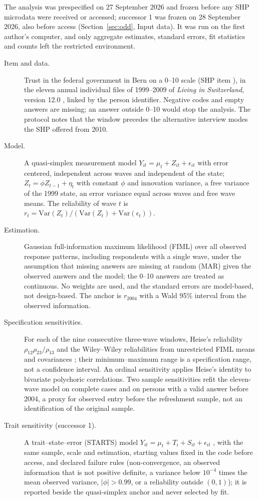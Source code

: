 The analysis was prespecified on 27 September 2026 and frozen before any SHP microdata were received or accessed; successor 1 was frozen on 28 September 2026, also before access (Section~\ref{sec:odd}, Input data). It was run on the first author's computer, and only aggregate estimates, standard errors, fit statistics and counts left the restricted environment.
\begin{description}
\item[Item and data.] Trust in the federal government in Bern on a 0--10 scale (SHP item ), in the eleven annual individual files of 1999--2009 of \emph{Living in Switzerland}, version 12.0 \cite{shpgroup2026data}, linked by the person identifier. Negative codes and empty answers are missing; an answer outside 0--10 would stop the analysis. The protocol notes that the window precedes the alternative interview modes the SHP offered from 2010.
\item[Model.] A quasi-simplex measurement model $Y_{it}=\mu_t+Z_{it}+\epsilon_{it}$ with error centered, independent across waves and independent of the state; $Z_t=\phi Z_{t-1}+\eta_t$ with constant $\phi$ and innovation variance, a free variance of the 1999 state, an error variance equal across waves and free wave means. The reliability of wave $t$ is $r_t=\mathrm{Var}(Z_t)/(\mathrm{Var}(Z_t)+\mathrm{Var}(\epsilon_t))$.
\item[Estimation.] Gaussian full-information maximum likelihood (FIML) over all observed response patterns, including respondents with a single wave, under the assumption that missing answers are missing at random (MAR) given the observed answers and the model; the 0--10 answers are treated as continuous. No weights are used, and the standard errors are model-based, not design-based. The anchor is $r_{2004}$ with a Wald 95\% interval from the observed information.
\item[Specification sensitivities.] For each of the nine consecutive three-wave windows, Heise's reliability $\rho_{12}\rho_{23}/\rho_{13}$ and the Wiley--Wiley reliabilities from unrestricted FIML means and covariances \cite{heise1969,wiley1970}; their minimum--maximum range is a specification range, not a confidence interval. An ordinal sensitivity applies Heise's identity to bivariate polychoric correlations. Two sample sensitivities refit the eleven-wave model on complete cases and on persons with a valid answer before 2004, a proxy for observed entry before the refreshment sample, not an identification of the original sample.
\item[Trait sensitivity (successor 1).] A trait--state--error (STARTS) model $Y_{it}=\mu_t+T_i+S_{it}+\epsilon_{it}$ \cite{kenny1995tse}, with the same sample, scale and estimation, starting values fixed in the code before access, and declared failure rules (non-convergence, an observed information that is not positive definite, a variance below $10^{-4}$ times the mean observed variance, $|\phi|>0.99$, or a reliability outside $(0,1)$); it is reported beside the quasi-simplex anchor and never selected by fit.

\end{description}

